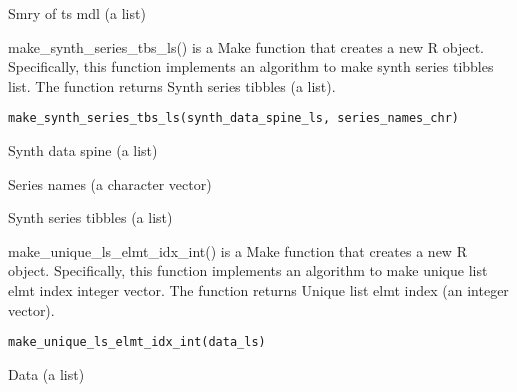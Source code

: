 \documentclass[a4paper]{book}
\begin{document}
%
\begin{Value}
Smry of ts mdl (a list)
\end{Value}
%
\begin{Description}\relax
make\_synth\_series\_tbs\_ls() is a Make function that creates a new R object. Specifically, this function implements an algorithm to make synth series tibbles list. The function returns Synth series tibbles (a list).
\end{Description}
%
\begin{Usage}
\begin{verbatim}
make_synth_series_tbs_ls(synth_data_spine_ls, series_names_chr)
\end{verbatim}
\end{Usage}
%
\begin{Arguments}
\begin{ldescription}
\item[\code{synth\_data\_spine\_ls}] Synth data spine (a list)

\item[\code{series\_names\_chr}] Series names (a character vector)
\end{ldescription}
\end{Arguments}
%
\begin{Value}
Synth series tibbles (a list)
\end{Value}
%
\begin{Description}\relax
make\_unique\_ls\_elmt\_idx\_int() is a Make function that creates a new R object. Specifically, this function implements an algorithm to make unique list elmt index integer vector. The function returns Unique list elmt index (an integer vector).
\end{Description}
%
\begin{Usage}
\begin{verbatim}
make_unique_ls_elmt_idx_int(data_ls)
\end{verbatim}
\end{Usage}
%
\begin{Arguments}
\begin{ldescription}
\item[\code{data\_ls}] Data (a list)
\end{ldescription}
\end{Arguments}
%
\end{document}

